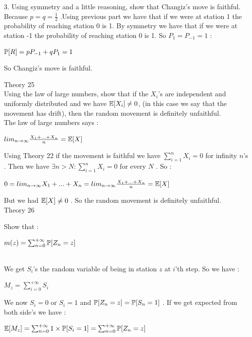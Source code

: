 \documentclass[30pt]{article}
\begin{document}
{\color{blue} {\large 3. }Using symmetry and a little reasoning, show that Changiz's move is faithful. } \\ \newline
Because $p = q = \frac{1}{2} $ .Using previous part we have that if we were at station 1 the probability of reaching station 0 is 1. By symmetry we have that if we were at station -1 the probability of reaching station 0 is 1. So $P_1 = P_{-1} = 1 $ : 
\begin{center}
    $\Bbb{P}[R] = pP_{-1} + qP_1 = 1 $
\end{center}
So Changiz's move is faithful.

{\Large \color{blue} Theory 25 } \\
{\color{blue} Using the law of large numbers, show that if the $X_i$'s are independent and uniformly distributed and we have $\Bbb{E}[X_i] \neq 0 $, (in this case we say that the movement has drift), then the random movement is definitely unfaithful.
} \\ \newline 
The law of large numbers says : 
\begin{center}
    $lim_{n\to \infty} \frac{X_1 + ... + X_n}{n} = \Bbb{E}[X] $
\end{center} 
Using {\color{blue} Theory 22} if the movement is faithful we have $\sum_{i=1}^{n} X_i = 0 $ for infinity $n$'s . Then we have $\exists n > N : \sum_{i=1}^{n} X_i = 0$ for every $N$ . So : 
\begin{center}
    $0 =lim_{n\to \infty} X_1 + ... + X_n = lim_{n\to \infty} \frac{X_1 + ... + X_n}{n} = \Bbb{E}[X] $
\end{center}
But we had $\Bbb{E}[X] \neq 0 $ . So the random movement is definitely unfaithful. \\

{\Large \color{blue} Theory 26 } \\
{\color{blue} Show that : 
\begin{center}
    $m(z) = \sum_{n=0}^{+\infty}\Bbb{P}[Z_n = z] $
\end{center}
} \\ \newline 
We get $S_i$'s the random variable of being in station $z$ at $i$'th step. So we have : 
\begin{center}
    $M_z = \sum_{i=0}^{+\infty}S_i $
\end{center}
We now $S_i = 0$ or $S_i = 1$ and $\Bbb{P}[Z_n = z] = \Bbb{P}[S_n = 1] $ . If we get expected from both side's we have : 
\begin{center}
    $\Bbb{E}[M_z] = \sum_{n=0}^{+\infty}1 \times \Bbb{P}[S_i = 1] =\sum_{n=0}^{+\infty}\Bbb{P}[Z_n = z]  $
\end{center} \\
\end{document}
